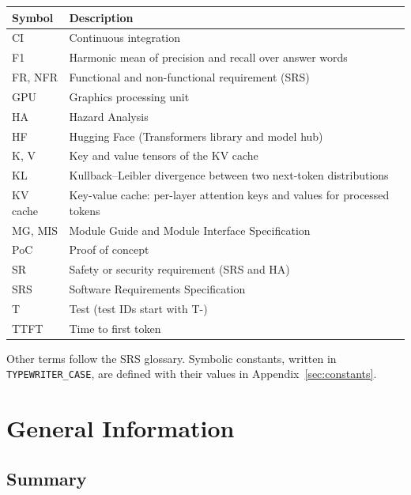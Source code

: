 \documentclass[12pt, titlepage]{article}
\newcommand{\cst}[1]{\texttt{#1}}
\begin{document}
\renewcommand{\arraystretch}{1.2}
\noindent\begin{minipage}{\textwidth}
\begin{tabularx}{\textwidth}{lX}
  \toprule
  \textbf{Symbol} & \textbf{Description}\\
  \midrule
  CI & Continuous integration\\
  F1 & Harmonic mean of precision and recall over answer words\\
  FR, NFR & Functional and non-functional requirement (SRS)\\
  GPU & Graphics processing unit\\
  HA & Hazard Analysis \citep{TandemHA}\\
  HF & Hugging Face (Transformers library and model hub)\\
  K, V & Key and value tensors of the KV cache\\
  KL & Kullback--Leibler divergence between two next-token distributions\\
  KV cache & Key-value cache: per-layer attention keys and values for
  processed tokens\\
  MG, MIS & Module Guide \citep{TandemMG} and Module Interface Specification \citep{TandemMIS}\\
  PoC & Proof of concept\\
  SR & Safety or security requirement (SRS and HA)\\
  SRS & Software Requirements Specification \citep{TandemSRS}\\
  T & Test (test IDs start with T-)\\
  TTFT & Time to first token\\
  \bottomrule
\end{tabularx}
\end{minipage}

\medskip
\noindent Other terms follow the SRS glossary. Symbolic constants, written
in \cst{TYPEWRITER\_CASE}, are defined with their values in
Appendix~\ref{sec:constants}.

\newpage


\section{General Information}

\subsection{Summary}
\end{document}
